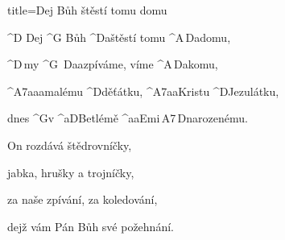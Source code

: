 \begin{song}{title=\predtitle\centering Dej Bůh štěstí tomu domu\\\large   \vspace*{-0.3cm}}  %
\begin{centerjustified}
\nejnejvetsi

\sloka
	^{D\,\,}Dej ^{G\,\,}Bůh ^{D{\color{white}a}}štěstí tomu ^{A\,D{\color{white}a}}domu,

	^{D\,}my ^{G\,\,\,D{\color{white}aa}}zpíváme, víme ^{A\,D{\color{white}a}}komu,

	^{A7{\color{white}aaa}}malému ^{D}děťátku, ^{A7{\color{white}aa}}Kristu ^{D}Jezulátku,

	dnes ^{G}v ^{{\color{white}a}D}Betlémě ^{{\color{white}aa}Emi\,A7\,D}narozenému.

\sloka
	On rozdává štědrovníčky,

	jabka, hrušky a trojníčky,

	za naše zpívání, za koledování,

	dejž vám Pán Bůh své požehnání.



\end{centerjustified}
\setcounter{Slokočet}{0}
\end{song}

